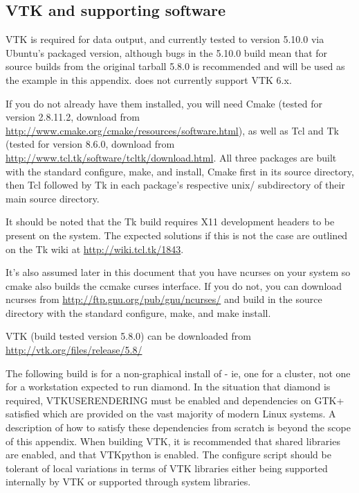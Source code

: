 \subsection{VTK and supporting software}
\label{sec:required_libraries_vtk}

VTK is required for \fluidity data output, and currently tested to version
5.10.0 via Ubuntu's packaged version, although bugs in the 5.10.0 build mean
that for source builds from the original tarball 5.8.0 is recommended and will
be used as the example in this appendix. \fluidity does not currently support
VTK 6.x.

If you do not already have them installed, you will need Cmake (tested for
version 2.8.11.2, download from
\url{http://www.cmake.org/cmake/resources/software.html}), as well as Tcl and
Tk (tested for version 8.6.0, download from
\url{http://www.tcl.tk/software/tcltk/download.html}. All three packages are
built with the standard configure, make, and install, Cmake first in its source
directory, then Tcl followed by Tk in each package's respective unix/
subdirectory of their main source directory.

It should be noted that the Tk build requires X11 development headers to be
present on the system. The expected solutions if this is not the case are
outlined on the Tk wiki at \url{http://wiki.tcl.tk/1843}.

It's also assumed later in this document that you have ncurses on your system
so cmake also builds the ccmake curses interface. If you do not, you can
download ncurses from \url{http://ftp.gnu.org/pub/gnu/ncurses/} and build in
the source directory with the standard configure, make, and make install.

VTK (build tested version 5.8.0) can be downloaded from
\url{http://vtk.org/files/release/5.8/}

The following build is for a non-graphical install of \fluidity - ie, one for a
cluster, not one for a workstation expected to run diamond. In the situation
that diamond is required, VTK{\textunderscore}USE{\textunderscore}RENDERING
must be enabled and dependencies on GTK+ satisfied which are provided on the
vast majority of modern Linux systems. A description of how to satisfy these
dependencies from scratch is beyond the scope of this appendix. When building
VTK, it is recommended that shared libraries are enabled, and that VTKpython is
enabled. The \fluidity configure script should be tolerant of local variations
in terms of VTK libraries either being supported internally by VTK or supported
through system libraries.

